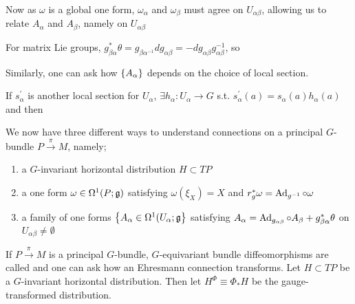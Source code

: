 \documentclass{article}
\begin{document}
Now as $\omega$ is a global one form, $\omega_\alpha$ and $\omega_\beta$ must agree on $U_{\alpha\beta}$, allowing us to relate $A_\alpha$ and $A_\beta$, namely on $U_{\alpha\beta}$

\begin{example}
	For matrix Lie groups, $g_{\beta\alpha}^\ast \theta = g_{\beta\alpha^{-1}}dg_{\alpha\beta} = -dg_{\alpha\beta}g_{\alpha\beta}^{-1}$, so 
\end{example}

Similarly, one can ask how $\left\{ A_\alpha \right\}$ depends on the choice of local section. 
\begin{fact}
	If $s_\alpha^\prime$ is another local section for $U_\alpha$, $\exists h_\alpha : U_\alpha \to G$ s.t. $s_\alpha^\prime(a) = s_\alpha(a) h_\alpha(a)$ and then 
\end{fact}

\begin{idea}
	We now have three different ways to understand connections on a principal $G$-bundle $P\overset{\pi}{\to} M$, namely;
	\begin{enumerate}
		\item a $G$-invariant horizontal distribution $H\subset TP$ 
		\item a one form $\omega \in \Omega^1(P;\mathfrak{g})$ satisfying $\omega(\xi_X) = X$ and $r_g^\ast \omega = \operatorname{Ad}_{g^{-1}} \circ \omega$
		\item a family of one forms $\left\{ A_\alpha \in \Omega^1(U_\alpha;\mathfrak{g} \right\}$ satisfying $A_\alpha = \operatorname{Ad}_{g_{\alpha\beta}}\circ A_\beta + g_{\beta\alpha}^\ast \theta$ on $U_{\alpha\beta}\neq \emptyset$
	\end{enumerate}
\end{idea}

If $P \overset{\pi}{\to} M$ is a principal $G$-bundle, $G$-equivariant bundle diffeomorphisms are called  and one can ask how an Ehresmann connection transforms. Let $H \subset TP$ be a $G$-invariant horizontal distribution. Then let $H^\Phi \equiv \Phi_\ast H$ be the gauge-transformed distribution. 
\end{document}
